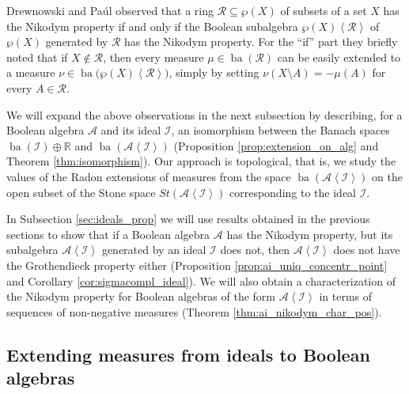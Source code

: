 \documentclass[a4paper,11pt,fleqn]{amsart}
\theoremstyle{definition}
\theoremstyle{remark}
\numberwithin{equation}{section}
\newcommand{\R}{\mathbb{R}}
\newcommand{\aA}{\mathcal{A}}
\newcommand{\iI}{\mathcal{I}}
\newcommand{\rR}{\mathcal{R}}
\DeclareMathOperator{\ba}{ba}
\newcommand{\sm}{\setminus}
\newcommand{\sub}{\subseteq}
\newcommand{\gen}[1]{\mathopen{}\left\langle#1\mathclose{}\right\rangle}
\begin{document}
Drewnowski and Pa\'ul \cite[Remark 2.2.(a)]{DP00} observed that a ring $\rR\sub\wp(X)$ of subsets of a set $X$ has the Nikodym property if and only if the Boolean subalgebra $\wp(X)\gen{\rR}$ of $\wp(X)$ generated by $\rR$ has the Nikodym property. For the ``if'' part they briefly noted that if $X\not\in\rR$, then every measure $\mu\in\ba(\rR)$ can be easily extended to a measure $\nu\in\ba\big(\wp(X)\gen{\rR}\!\big)$, simply by setting $\nu(X\sm A)=-\mu(A)$ for every $A\in\rR$. 

We will expand the above observations in the next subsection by describing, for a Boolean algebra $\aA$ and its ideal $\iI$, an isomorphism between the Banach spaces $\ba(\iI)\oplus\R$ and $\ba(\aA\gen{\iI})$ (Proposition \ref{prop:extension_on_alg} and Theorem \ref{thm:isomorphism}). Our approach is topological, that is, we study the values of the Radon extensions of measures from the space $\ba(\aA\gen{\iI})$ on the open subset of the Stone space $St(\aA\gen{\iI})$ corresponding to the ideal $\iI$.

In Subsection \ref{sec:ideals_prop} we will use results obtained in the previous sections to show that if a Boolean algebra $\aA$ has the Nikodym property, but its subalgebra $\aA\gen{\iI}$ generated by an ideal $\iI$ does not, then $\aA\gen{\iI}$ does not have the Grothendieck property either (Proposition \ref{prop:ai_uniq_concentr_point} and Corollary \ref{cor:sigmacompl_ideal}). We will also obtain a characterization of the Nikodym property for Boolean algebras of the form $\aA\gen{\iI}$ in terms of sequences of non-negative measures (Theorem \ref{thm:ai_nikodym_char_pos}).

\subsection{Extending measures from ideals to Boolean algebras\label{sec:extending}}
\end{document}
